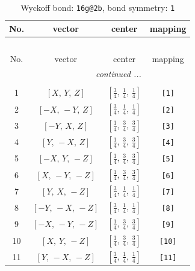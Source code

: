 \documentclass[fleqn,8pt]{jsarticle}
\begin{document}
\begin{longtable}{cccc}
\caption{Wyckoff bond: {\tt 16g@2b}, bond symmetry: {\tt 1}}
 \\
 \hline \hline
No. & vector & center & mapping \\ \hline \endfirsthead

\multicolumn{3}{l}{\tablename\ \thetable{}} \\
 \hline \hline
No. & vector & center & mapping \\ \hline \endhead

 \hline \hline
\multicolumn{3}{r}{\footnotesize\it continued ...} \\ \endfoot

 \hline \hline
\multicolumn{3}{r}{} \\ \endlastfoot

1 & $\left[ X,\, Y,\, Z \right]$ & $\left[ \frac{3}{4},\, \frac{1}{4},\, \frac{1}{4} \right]$ & {\tt [1]} \\ \hline
2 & $\left[ - X,\, - Y,\, Z \right]$ & $\left[ \frac{3}{4},\, \frac{1}{4},\, \frac{1}{4} \right]$ & {\tt [2]} \\ \hline
3 & $\left[ - Y,\, X,\, Z \right]$ & $\left[ \frac{1}{4},\, \frac{3}{4},\, \frac{3}{4} \right]$ & {\tt [3]} \\ \hline
4 & $\left[ Y,\, - X,\, Z \right]$ & $\left[ \frac{1}{4},\, \frac{3}{4},\, \frac{3}{4} \right]$ & {\tt [4]} \\ \hline
5 & $\left[ - X,\, Y,\, - Z \right]$ & $\left[ \frac{1}{4},\, \frac{3}{4},\, \frac{3}{4} \right]$ & {\tt [5]} \\ \hline
6 & $\left[ X,\, - Y,\, - Z \right]$ & $\left[ \frac{1}{4},\, \frac{3}{4},\, \frac{3}{4} \right]$ & {\tt [6]} \\ \hline
7 & $\left[ Y,\, X,\, - Z \right]$ & $\left[ \frac{3}{4},\, \frac{1}{4},\, \frac{1}{4} \right]$ & {\tt [7]} \\ \hline
8 & $\left[ - Y,\, - X,\, - Z \right]$ & $\left[ \frac{3}{4},\, \frac{1}{4},\, \frac{1}{4} \right]$ & {\tt [8]} \\ \hline
9 & $\left[ - X,\, - Y,\, - Z \right]$ & $\left[ \frac{1}{4},\, \frac{3}{4},\, \frac{3}{4} \right]$ & {\tt [9]} \\ \hline
10 & $\left[ X,\, Y,\, - Z \right]$ & $\left[ \frac{1}{4},\, \frac{3}{4},\, \frac{3}{4} \right]$ & {\tt [10]} \\ \hline
11 & $\left[ Y,\, - X,\, - Z \right]$ & $\left[ \frac{3}{4},\, \frac{1}{4},\, \frac{1}{4} \right]$ & {\tt [11]} \\ \hline

\end{longtable}
\end{document}
